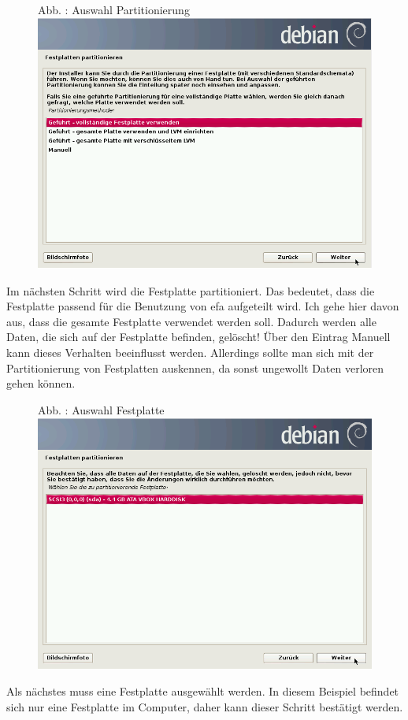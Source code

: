 \documentclass[a4paper,12pt,twoside]{article}
\newcounter{Abb}
\renewcommand\theAbb{\arabic{Abb}}
\begin{document}
\begin{figure}
\centering
\begin{minipage}{11.261cm}
Abb. \stepcounter{Abb}{\theAbb}: Auswahl Partitionierung
\includegraphics[width=11.261cm,height=8.424cm]{efaLivede-img/efaLivede-img9.png}\end{minipage}
\end{figure}
Im nächsten Schritt wird die Festplatte partitioniert. Das bedeutet,
dass die Festplatte passend für die Benutzung von efa aufgeteilt wird.
Ich gehe hier davon aus, dass die gesamte Festplatte verwendet werden
soll. Dadurch werden alle Daten, die sich auf der Festplatte befinden,
gelöscht! Über den Eintrag {\textquotedbl}Manuell{\textquotedbl} kann
dieses Verhalten beeinflusst werden. Allerdings sollte man sich mit der
Partitionierung von Festplatten auskennen, da sonst ungewollt Daten
verloren gehen können.


\bigskip


\bigskip



\begin{figure}
\centering
\begin{minipage}{11.25cm}
Abb. \stepcounter{Abb}{\theAbb}: Auswahl Festplatte
\includegraphics[width=11.25cm,height=8.451cm]{efaLivede-img/efaLivede-img10.png}\end{minipage}
\end{figure}
Als nächstes muss eine Festplatte ausgewählt werden. In diesem Beispiel
befindet sich nur eine Festplatte im Computer, daher kann dieser
Schritt bestätigt werden.
\end{document}
